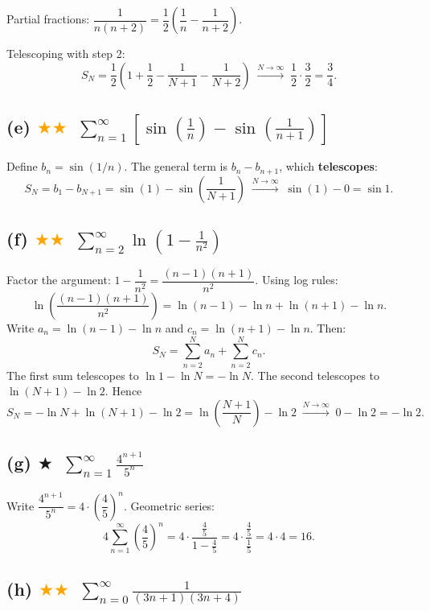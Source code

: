 \documentclass[12pt,a4paper]{article}
\newcommand{\easy}{\textcolor{green!60!black}{$\bigstar$}}
\newcommand{\medium}{\textcolor{orange}{$\bigstar\bigstar$}}
\begin{document}
Partial fractions: $\dfrac{1}{n(n+2)} = \dfrac{1}{2}\!\left(\dfrac{1}{n}-\dfrac{1}{n+2}\right)$.

Telescoping with step 2:
\[
  S_N = \frac{1}{2}\!\left(1 + \frac{1}{2} - \frac{1}{N+1} - \frac{1}{N+2}\right)
  \;\xrightarrow{N\to\infty}\;
  \frac{1}{2}\cdot\frac{3}{2} = \boxed{\frac{3}{4}}.
\]

\subsection*{(e) \medium\ $\displaystyle\sum_{n=1}^{\infty}\!\left[\sin\!\left(\frac{1}{n}\right)-\sin\!\left(\frac{1}{n+1}\right)\right]$}

Define $b_n = \sin(1/n)$. The general term is $b_n - b_{n+1}$, which \textbf{telescopes}:
\[
  S_N = b_1 - b_{N+1} = \sin(1) - \sin\!\left(\frac{1}{N+1}\right)
  \;\xrightarrow{N\to\infty}\;
  \sin(1) - 0 = \boxed{\sin 1}.
\]

\subsection*{(f) \medium\ $\displaystyle\sum_{n=2}^{\infty}\ln\!\left(1-\frac{1}{n^2}\right)$}

Factor the argument: $1 - \dfrac{1}{n^2} = \dfrac{(n-1)(n+1)}{n^2}$.  Using log rules:
\[
  \ln\!\left(\frac{(n-1)(n+1)}{n^2}\right)
  = \ln(n-1) - \ln n + \ln(n+1) - \ln n.
\]
Write $a_n = \ln(n-1) - \ln n$ and $c_n = \ln(n+1) - \ln n$. Then:
\[
  S_N = \sum_{n=2}^{N} a_n + \sum_{n=2}^{N} c_n.
\]
The first sum telescopes to $\ln 1 - \ln N = -\ln N$.  The second telescopes to $\ln(N+1) - \ln 2$.  Hence
\[
  S_N = -\ln N + \ln(N+1) - \ln 2
  = \ln\!\left(\frac{N+1}{N}\right) - \ln 2
  \;\xrightarrow{N\to\infty}\; 0 - \ln 2 = \boxed{-\ln 2}.
\]

\subsection*{(g) \easy\ $\displaystyle\sum_{n=1}^{\infty}\frac{4^{n+1}}{5^n}$}

Write $\dfrac{4^{n+1}}{5^n} = 4\cdot\left(\dfrac{4}{5}\right)^n$.  Geometric series:
\[
  4\sum_{n=1}^{\infty}\left(\frac{4}{5}\right)^n
  = 4\cdot\frac{\tfrac{4}{5}}{1-\tfrac{4}{5}}
  = 4\cdot\frac{\tfrac{4}{5}}{\tfrac{1}{5}} = 4\cdot 4 = \boxed{16}.
\]

\subsection*{(h) \medium\ $\displaystyle\sum_{n=0}^{\infty}\frac{1}{(3n+1)(3n+4)}$}
\end{document}
